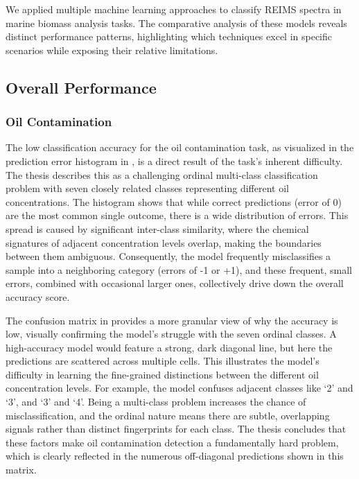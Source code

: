 We applied multiple machine learning approaches to classify REIMS spectra in marine biomass analysis tasks. The comparative analysis of these models reveals distinct performance patterns, highlighting which techniques excel in specific scenarios while exposing their relative limitations.

\subsection{Overall Performance}

\subsubsection{Oil Contamination}

The low classification accuracy for the oil contamination task, as visualized in the prediction error histogram in , is a direct result of the task's inherent difficulty. The thesis describes this as a challenging ordinal multi-class classification problem with seven closely related classes representing different oil concentrations. The histogram shows that while correct predictions (error of 0) are the most common single outcome, there is a wide distribution of errors. This spread is caused by significant 
inter-class similarity, where the chemical signatures of adjacent concentration levels overlap, making the boundaries between them ambiguous. Consequently, the model frequently misclassifies a sample into a neighboring category (errors of -1 or +1), and these frequent, small errors, combined with occasional larger ones, collectively drive down the overall accuracy score.

The confusion matrix in  provides a more granular view of why the accuracy is low, visually confirming the model's struggle with the seven ordinal classes. A high-accuracy model would feature a strong, dark diagonal line, but here the predictions are scattered across multiple cells. This illustrates the model's difficulty in learning the 
fine-grained distinctions between the different oil concentration levels. For example, the model confuses adjacent classes like `2' and `3', and `3' and `4'. Being a 
multi-class problem increases the chance of misclassification, and the ordinal nature means there are subtle, overlapping signals rather than distinct fingerprints for each class. The thesis concludes that these factors make oil contamination detection a fundamentally hard problem, which is clearly reflected in the numerous off-diagonal predictions shown in this matrix.

